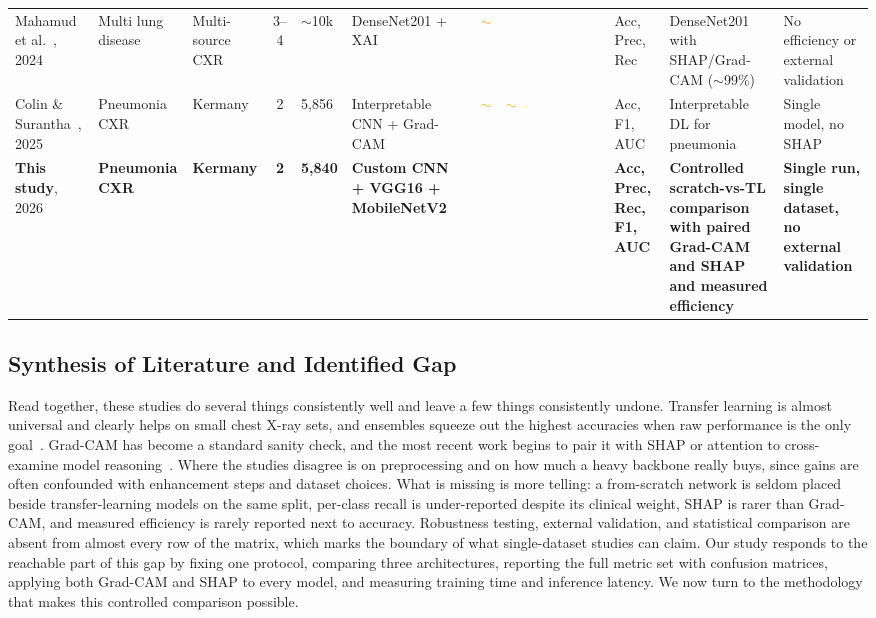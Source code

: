 \documentclass[preprint,12pt]{elsarticle}
\newcommand{\cmark}{\ding{51}} %
\newcommand{\xmark}{\ding{55}} %
\newcommand{\pmark}{\textcolor{orange}{$\sim$}} %
\begin{document}
\begin{table}
\begin{adjustbox}{max width=\textwidth}
\begin{tabular}{p{1.5cm} p{1.7cm} p{1.4cm} c p{1.0cm} p{1.9cm} c c c c c c c c c p{1.7cm} p{2.4cm} p{2.4cm}}
Mahamud et al.~\cite{mahamud2024explainable}, 2024 & Multi lung disease & Multi-source CXR & 3--4 & $\sim$10k & DenseNet201 + XAI & \cmark & \pmark & \cmark & \cmark & \cmark & \xmark & \xmark & \xmark & \xmark & Acc, Prec, Rec & DenseNet201 with SHAP/Grad-CAM ($\sim$99\%) & No efficiency or external validation \\
Colin \& Surantha~\cite{colin2025interpretable}, 2025 & Pneumonia CXR & Kermany & 2 & 5{,}856 & Interpretable CNN + Grad-CAM & \cmark & \pmark & \pmark & \cmark & \xmark & \xmark & \xmark & \xmark & \xmark & Acc, F1, AUC & Interpretable DL for pneumonia & Single model, no SHAP \\
\textbf{This study}, 2026 & \textbf{Pneumonia CXR} & \textbf{Kermany} & \textbf{2} & \textbf{5{,}840} & \textbf{Custom CNN + VGG16 + MobileNetV2} & \cmark & \cmark & \cmark & \cmark & \cmark & \xmark & \xmark & \xmark & \cmark & \textbf{Acc, Prec, Rec, F1, AUC} & \textbf{Controlled scratch-vs-TL comparison with paired Grad-CAM and SHAP and measured efficiency} & \textbf{Single run, single dataset, no external validation} \\
\bottomrule
\end{tabular}
\end{adjustbox}
\end{table}

\subsection{Synthesis of Literature and Identified Gap}
Read together, these studies do several things consistently well and leave a few things consistently undone.
Transfer learning is almost universal and clearly helps on small chest X-ray sets, and ensembles squeeze out the highest accuracies when raw performance is the only goal~\cite{kundu2021pneumonia,mabrouk2022pneumonia}.
Grad-CAM has become a standard sanity check, and the most recent work begins to pair it with SHAP or attention to cross-examine model reasoning~\cite{du2023classification,bhatia2024evaluating,mahamud2024explainable}.
Where the studies disagree is on preprocessing and on how much a heavy backbone really buys, since gains are often confounded with enhancement steps and dataset choices.
What is missing is more telling: a from-scratch network is seldom placed beside transfer-learning models on the same split, per-class recall is under-reported despite its clinical weight, SHAP is rarer than Grad-CAM, and measured efficiency is rarely reported next to accuracy.
Robustness testing, external validation, and statistical comparison are absent from almost every row of the matrix, which marks the boundary of what single-dataset studies can claim.
Our study responds to the reachable part of this gap by fixing one protocol, comparing three architectures, reporting the full metric set with confusion matrices, applying both Grad-CAM and SHAP to every model, and measuring training time and inference latency.
We now turn to the methodology that makes this controlled comparison possible.
\end{document}
